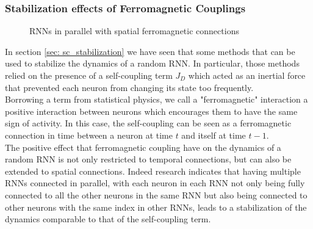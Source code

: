 \documentclass[a4paper,12pt]{report}
\begin{document}
\subsubsection*{Stabilization effects of Ferromagnetic Couplings}

\begin{figure}[h!] %
    \centering
    \caption{RNNs in parallel with spatial ferromagnetic connections}
    \label{fig:diagram_spatial_ferromagnetic}
\end{figure}

In section \ref{sec: sc_stabilization} we have seen that some methods that can be used to stabilize the 
dynamics of a random RNN. In particular, those methods relied on the presence of a self-coupling term
$J_D$ which acted as an inertial force that prevented each neuron from changing its state too 
frequently. \\
Borrowing a term from statistical physics, we call a "ferromagnetic" interaction a positive 
interaction between neurons which encourages them to have the same sign of activity. 
In this case, the self-coupling can be seen as a ferromagnetic connection in time between a neuron at 
time $t$ and itself at time $t-1$. \\
The positive effect that ferromagnetic coupling have on the dynamics of a random RNN is not only 
restricted to temporal connections, but can also be extended to spatial connections. Indeed research 
indicates that having multiple RNNs connected in parallel, with each neuron in each RNN not only 
being fully connected to all the other neurons in the same RNN but also being connected to other 
neurons with the same index in other RNNs, leads to a stabilization of the dynamics comparable to
that of the self-coupling term.
\end{document}

